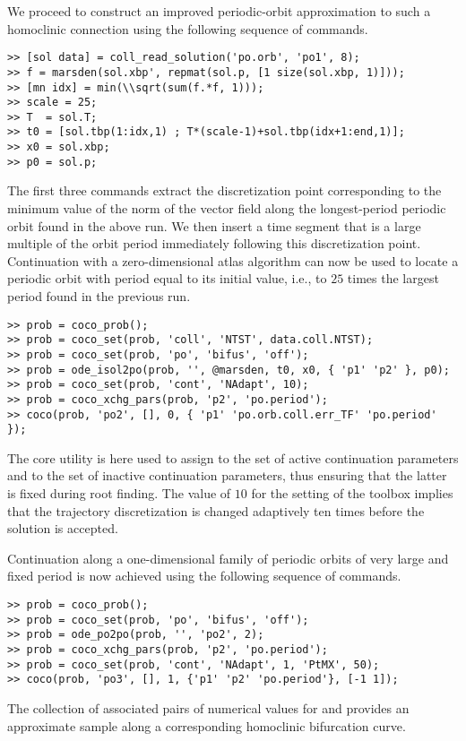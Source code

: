 We proceed to construct an improved periodic-orbit approximation to such a homoclinic connection using the following sequence of commands.
\begin{lstlisting}[language=coco-highlight]
>> [sol data] = coll_read_solution('po.orb', 'po1', 8);
>> f = marsden(sol.xbp', repmat(sol.p, [1 size(sol.xbp, 1)]));
>> [mn idx] = min(\\sqrt(sum(f.*f, 1)));
>> scale = 25;
>> T  = sol.T;
>> t0 = [sol.tbp(1:idx,1) ; T*(scale-1)+sol.tbp(idx+1:end,1)];
>> x0 = sol.xbp;
>> p0 = sol.p;
\end{lstlisting}
The first three commands extract the discretization point corresponding to the minimum value of the norm of the vector field along the longest-period periodic orbit found in the above run. We then insert a time segment that is a large multiple of the orbit period immediately following this discretization point. Continuation with a zero-dimensional atlas algorithm can now be used to locate a periodic orbit with period equal to its initial value, i.e., to $25$ times the largest period found in the previous run.
\begin{lstlisting}[language=coco-highlight]
>> prob = coco_prob();
>> prob = coco_set(prob, 'coll', 'NTST', data.coll.NTST);
>> prob = coco_set(prob, 'po', 'bifus', 'off');
>> prob = ode_isol2po(prob, '', @marsden, t0, x0, { 'p1' 'p2' }, p0);
>> prob = coco_set(prob, 'cont', 'NAdapt', 10);
>> prob = coco_xchg_pars(prob, 'p2', 'po.period');
>> coco(prob, 'po2', [], 0, { 'p1' 'po.orb.coll.err_TF' 'po.period' });
\end{lstlisting}
The  core utility is here used to assign  to the set of active continuation parameters and  to the set of inactive continuation parameters, thus ensuring that the latter is fixed during root finding. The value of $10$ for the  setting of the  toolbox implies that the trajectory discretization is changed adaptively ten times before the solution is accepted.

Continuation along a one-dimensional family of periodic orbits of very large and fixed period is now achieved using the following sequence of commands.
\begin{lstlisting}[language=coco-highlight]
>> prob = coco_prob();
>> prob = coco_set(prob, 'po', 'bifus', 'off');
>> prob = ode_po2po(prob, '', 'po2', 2);
>> prob = coco_xchg_pars(prob, 'p2', 'po.period');
>> prob = coco_set(prob, 'cont', 'NAdapt', 1, 'PtMX', 50);
>> coco(prob, 'po3', [], 1, {'p1' 'p2' 'po.period'}, [-1 1]);
\end{lstlisting}
The collection of associated pairs of numerical values for  and  provides an approximate sample along a corresponding homoclinic bifurcation curve.\\
\medskip

